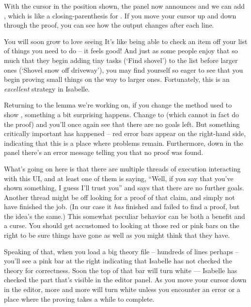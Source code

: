 With the cursor in the position shown, the  panel now announces  and we can add , which is like a closing-parenthesis for . If you move your cursor up and down through the proof, you can see how the output changes after each line. 

You will soon grow to love seeing  It's like being able to check an item off your list of things you need to do -- it feels good! And just as some people enjoy that so much that they begin adding tiny tasks (`Find shovel') to the list before larger ones (`Shovel snow off driveway'), you may find yourself so eager to see  that you begin proving small things on the way to larger ones. Fortunately, this is an \textit{excellent} strategy in Isabelle. 

Returning to the lemma we're working on, if you change the method used to show , something a bit surprising happens. Change  to  (which cannot in fact do the proof) and you'll once again see that there are no goals left. But something critically important has happened -- red error bars appear on the right-hand side, indicating that this is a place where problems remain. Furthermore, down in the  panel there's an error message telling you that no proof was found. 

What's going on here is that there are multiple threads of execution interacting with this UI, and at least one of them is saying, ``Well, if you say that you've shown something, I guess I'll trust you'' and says that there are no further goals. Another thread might be off looking for a proof of that claim, and simply not have finished the job. (In our case it \textit{has} finished and failed to find a proof, but the idea's the same.) This somewhat peculiar behavior can be both a benefit and a curse. You should get accustomed to looking at those red or pink bars on the right to be sure things have gone as well as you might think that they have. 

Speaking of that, when you load a big theory file -- hundreds of lines perhaps -- you'll see a pink bar at the right indicating that Isabelle has not checked the theory for correctness. Soon the top of that bar will turn white --- Isabelle has checked the part that's visible in the editor panel. As you move your cursor down in the editor, more and more will turn white unless you encounter an error or a place where the proving takes a while to complete. 

